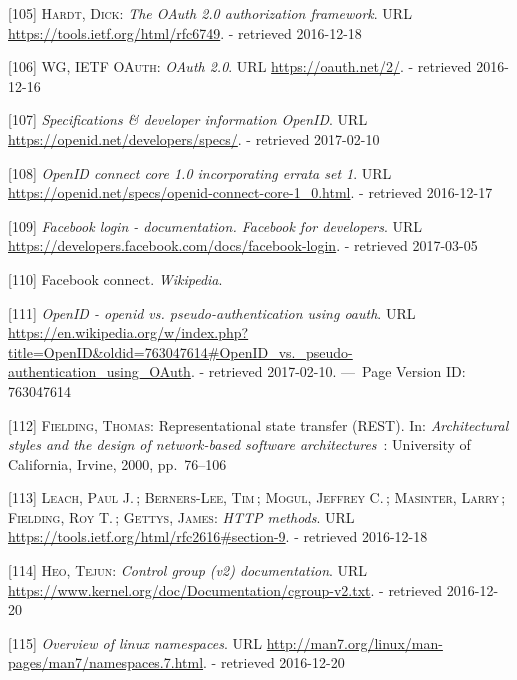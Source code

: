 \documentclass[12pt,english,a4paper,titlepage,cleardoublepage=empty,dottedtoc]{report}
\begin{document}
\hypertarget{ref-web_spec_oauth-2}{}
{[}105{]} \textsc{Hardt, Dick}: \emph{The OAuth 2.0 authorization
framework}. URL \url{https://tools.ietf.org/html/rfc6749}. - retrieved
2016-12-18

\hypertarget{ref-web_2016_oauth-2}{}
{[}106{]} \textsc{WG, IETF OAuth}: \emph{OAuth 2.0}. URL
\url{https://oauth.net/2/}. - retrieved 2016-12-16

\hypertarget{ref-web_spec_openid-spec-index}{}
{[}107{]} \emph{Specifications \& developer information OpenID}. URL
\url{https://openid.net/developers/specs/}. - retrieved 2017-02-10

\hypertarget{ref-web_spec_openid-connect-1}{}
{[}108{]} \emph{OpenID connect core 1.0 incorporating errata set 1}. URL
\url{https://openid.net/specs/openid-connect-core-1_0.html}. - retrieved
2016-12-17

\hypertarget{ref-web_docs_facebook-login}{}
{[}109{]} \emph{Facebook login - documentation. Facebook for
developers}. URL
\url{https://developers.facebook.com/docs/facebook-login}. - retrieved
2017-03-05

\hypertarget{ref-web_2017_wikipedia_facebook-connect}{}
{[}110{]} Facebook connect. \emph{Wikipedia}.

\hypertarget{ref-web_2017_wikipedia_openid-vs-pseudo-oauth}{}
{[}111{]} \emph{OpenID - openid vs. pseudo-authentication using oauth}.
URL
\url{https://en.wikipedia.org/w/index.php?title=OpenID\&oldid=763047614\#OpenID_vs._pseudo-authentication_using_OAuth}.
- retrieved 2017-02-10. ---~Page Version ID: 763047614

\hypertarget{ref-web_spec_rest}{}
{[}112{]} \textsc{Fielding, Thomas}: Representational state transfer
(REST). In: \emph{Architectural styles and the design of network-based
software architectures}~: University of California, Irvine, 2000,
pp.~76--106

\hypertarget{ref-web_spec_http-methods}{}
{[}113{]} \textsc{Leach, Paul J.}\,; \textsc{Berners-Lee, Tim}\,;
\textsc{Mogul, Jeffrey C.}\,; \textsc{Masinter, Larry}\,;
\textsc{Fielding, Roy T.}\,; \textsc{Gettys, James}: \emph{HTTP
methods}. URL \url{https://tools.ietf.org/html/rfc2616\#section-9}. -
retrieved 2016-12-18

\hypertarget{ref-web_2015_cgroup-doc}{}
{[}114{]} \textsc{Heo, Tejun}: \emph{Control group (v2) documentation}.
URL \url{https://www.kernel.org/doc/Documentation/cgroup-v2.txt}. -
retrieved 2016-12-20

\hypertarget{ref-web_2016_kernel-namespace}{}
{[}115{]} \emph{Overview of linux namespaces}. URL
\url{http://man7.org/linux/man-pages/man7/namespaces.7.html}. -
retrieved 2016-12-20
\end{document}
